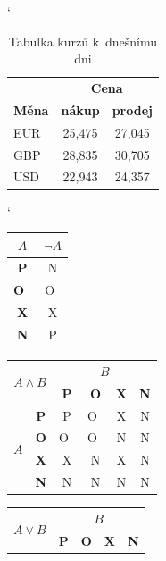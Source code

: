 \documentclass[11pt, a4paper]{article}
\begin{document}
\begin{table}[h!] \catcode`
\centering
    \begin{tabular}{|l|c|c|}\hline
         & \multicolumn{2}{c|}{\bfseries Cena} \\ \cline{2-3}
         \bfseries Měna &
         \bfseries nákup &
         \bfseries prodej \\ \hline
         EUR & 25,475 & 27,045\\
         GBP & 28,835 & 30,705\\
         USD & 22,943 & 24,357\\ \hline
    \end{tabular}
    \caption{Tabulka kurzů k~dnešnímu dni} \label{tab:kurzy}
\end{table}

\begin{table}[h!] \catcode`
\centering
    \begin{tabular}{|c|c|}\hline
         $A$ &
         $\neg A$ \\ \hline
         \bfseries P & N \\ \hline
         \bfseries O~& O~\\ \hline
         \bfseries X & X \\ \hline
         \bfseries N & P \\ \hline
    \end{tabular}
    \begin{tabular}{|c|c|c|c|c|c|}\hline
        \multicolumn{2}{|c|}{\multirow{2}{*}{$A \land B$}} & \multicolumn{4}{c|}{$B$}\\ \cline{3-6} 
        \multicolumn{2}{|c|}{} & \textbf{P} & \textbf{O} & \textbf{X} & \textbf{N} \\ \hline
        \multirow{4}{*}{$A$} & \textbf{P} & P & O~& X & N \\ \cline{2-6} 
                             & \textbf{O} & O~& O~& N & N \\ \cline{2-6} 
                             & \textbf{X} & X & N & X & N \\ \cline{2-6} 
                             & \textbf{N} & N & N & N & N \\ \hline
    \end{tabular}
    \begin{tabular}{|c|c|c|c|c|c|}\hline
        \multicolumn{2}{|c|}{\multirow{2}{*}{$A \lor B$}} & \multicolumn{4}{c|}{$B$}\\ \cline{3-6} 
        \multicolumn{2}{|c|}{} & \textbf{P} & \textbf{O} & \textbf{X} & \textbf{N} \\ \hline

\end{tabular}
\end{table}
\end{document}
